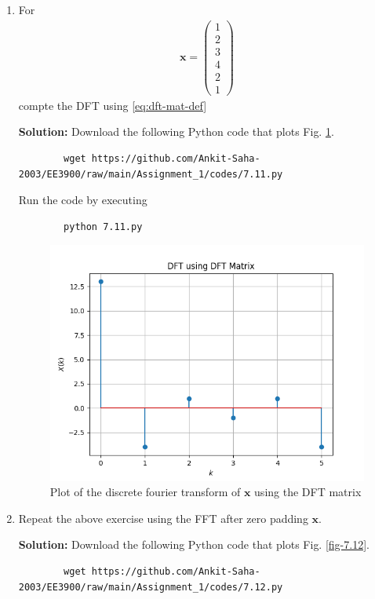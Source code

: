 \documentclass[journal,12pt,twocolumn]{IEEEtran}
\newcommand{\myvec}[1]{\ensuremath{\begin{pmatrix}#1\end{pmatrix}}}
\newcommand{\solution}{\noindent \textbf{Solution: }}
\let\vec\mathbf
\numberwithin{equation}{section}
\renewcommand\thesection{\arabic{section}}
\newcommand{\myvec}[1]{\ensuremath{\begin{pmatrix}#1\end{pmatrix}}}
\renewcommand\thesection{\arabic{section}}
\begin{document}
\begin{enumerate}[label=\arabic*.,ref=\thesection.\theenumi]
\item For 
    \begin{align}
	    \vec{x} = \myvec{1\\2\\3\\4\\2\\1}
        \label{eq:equation1}
    \end{align}
    compte the DFT  
		using 
	    \eqref{eq:dft-mat-def}
	    
	\solution Download the following Python code that plots Fig. \ref{fig-7.11}.
	\begin{lstlisting}
		wget https://github.com/Ankit-Saha-2003/EE3900/raw/main/Assignment_1/codes/7.11.py
	\end{lstlisting}
	
	Run the code by executing
	\begin{lstlisting}
		python 7.11.py
	\end{lstlisting}

	\begin{figure}[!ht]
		\centering
		\includegraphics[width=\columnwidth]{figs/7.11.png}
		\caption{Plot of the discrete fourier transform of $\vec{x}$ using the DFT matrix}
		\label{fig-7.11}	
	\end{figure}
	
	
    \item Repeat the above exercise using the FFT
	    after zero padding $\vec{x}$.

	\solution Download the following Python code that plots Fig. \ref{fig-7.12}.
	\begin{lstlisting}
		wget https://github.com/Ankit-Saha-2003/EE3900/raw/main/Assignment_1/codes/7.12.py
	\end{lstlisting}
	

\end{enumerate}
\end{document}
